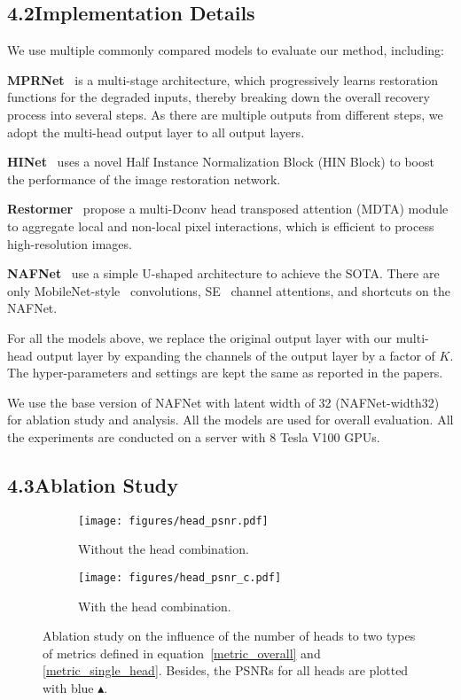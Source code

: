 \documentclass[letterpaper]{article} \usepackage{aaai23}  \usepackage{times}  \usepackage{helvet}  \usepackage{courier}  \usepackage[hyphens]{url}  \usepackage{graphicx} \urlstyle{rm} \def\UrlFont{\rm}  \usepackage{natbib}  \usepackage{caption} \frenchspacing  \setlength{\pdfpagewidth}{8.5in} \setlength{\pdfpageheight}{11in} \usepackage{algorithm}
\begin{document}
\subsection{4.2\quad Implementation Details}

We use multiple commonly compared models to evaluate our method, including:

\textbf{MPRNet}~\cite{zamir2021multi} is a multi-stage architecture, which progressively learns restoration functions for the degraded inputs, thereby breaking down the overall recovery process into several steps. As there are multiple outputs from different steps, we adopt the multi-head output layer to all output layers.

\textbf{HINet}~\cite{chen2021hinet} uses a novel Half Instance Normalization Block (HIN Block) to boost the performance of the image restoration network. 

\textbf{Restormer}~\cite{zamir2022restormer} propose a multi-Dconv head transposed attention (MDTA) module to aggregate local and non-local pixel interactions, which is efficient to process high-resolution images. 

\textbf{NAFNet}~\cite{chen2022simple} use a simple U-shaped architecture to achieve the SOTA. 
There are only MobileNet-style~\cite{howard2017mobilenets} convolutions, SE~\cite{hu2018squeeze} channel attentions, and shortcuts on the NAFNet.

For all the models above, we replace the original output layer with our multi-head output layer by expanding the channels of the output layer by a factor of $K$. The hyper-parameters and settings are kept the same as reported in the papers.

We use the base version of NAFNet with latent width of 32 (NAFNet-width32) for ablation study and analysis. All the models are used for overall evaluation. All the experiments are conducted on a server with 8 Tesla V100 GPUs.

\subsection{4.3\quad Ablation Study}

\begin{figure}[t]
    \centering
    \begin{subfigure}[b]{1\columnwidth}
        \centering
        \texttt{[image: figures/head\_psnr.pdf]}
        \caption{Without the head combination.}
        \label{fig:head_psnr}
    \end{subfigure}
    \begin{subfigure}[b]{1\columnwidth}
        \centering
        \texttt{[image: figures/head\_psnr\_c.pdf]}
        \caption{With the head combination.}
        \label{fig:head_psnr_c}
    \end{subfigure}
    \caption{Ablation study on the influence of the number of heads to two types of metrics defined in equation~\ref{metric_overall} and \ref{metric_single_head}. Besides, the PSNRs for all heads are plotted with blue $\blacktriangle$.}
    \label{fig:head_psnrs}
\end{figure}
\end{document}
